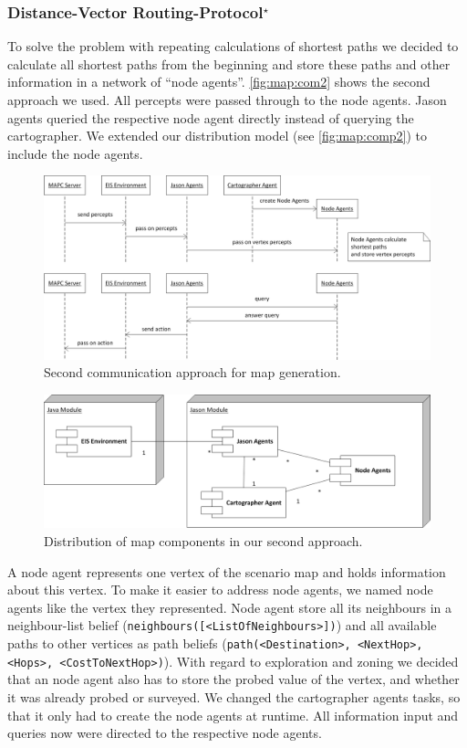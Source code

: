 \subsubsection[Distance-Vector Routing Protocol]{Distance-Vector Routing-Protocol$^\star$}\label{alg:map_dv}
To solve the problem with repeating calculations of shortest paths we decided to calculate all shortest paths from the beginning and store these paths and other information in a network of ``node agents''. \autoref{fig:map:com2} shows the second approach we used. All percepts were passed through to the node agents. Jason agents queried the respective node agent directly instead of querying the cartographer. We extended our distribution model (see \autoref{fig:map:comp2}) to include the node agents.
\begin{figure}
  \centering
  \includegraphics[width=\linewidth]{images/map_com_2.png}
  \caption{Second communication approach for map generation.}
  \label{fig:map:com2}
\end{figure}

\begin{figure}
  \centering
  \includegraphics[width=\linewidth]{images/map_comp_2.png}
  \caption{Distribution of map components in our second approach.}
  \label{fig:map:comp2}
\end{figure}

A node agent represents one vertex of the scenario map and holds information about this vertex. To make it easier to address node agents, we named node agents like the vertex they represented. Node agent store all its neighbours in a neighbour-list belief (\texttt{neighbours([<ListOfNeighbours>])}) and all available paths to other vertices as path beliefs (\texttt{path(<Destination>, <NextHop>, <Hops>, <CostToNextHop>)}). With regard to exploration and zoning we decided that an node agent also has to store the probed value of the vertex, and whether it was already probed or surveyed. We changed the cartographer agents tasks, so that it only had to create the node agents at runtime. All information input and queries now were directed to the respective node agents.

